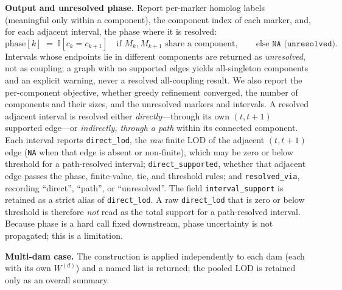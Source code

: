 \documentclass[11pt]{article}
\begin{document}
\medskip
\noindent\textbf{Output and unresolved phase.}
Report per-marker homolog labels (meaningful only within a component), the component index of each
marker, and, for each adjacent interval, the phase where it is resolved:
\[
  \text{phase}[k] \;=\; \mathbb{I}[c_k=c_{k+1}] \quad\text{if } M_k, M_{k+1} \text{ share a component},
  \qquad \text{else } \texttt{NA (unresolved)}.
\]
Intervals whose endpoints lie in different components are returned as \emph{unresolved}, not as
coupling; a graph with no supported edges yields all-singleton components and an explicit warning,
never a resolved all-coupling result. We also report the per-component objective, whether greedy
refinement converged, the number of components and their sizes, and the unresolved markers and
intervals. A resolved adjacent interval is resolved either \emph{directly}---through its own $(t,t{+}1)$
supported edge---or \emph{indirectly, through a path} within its connected component. Each interval
reports \texttt{direct\_lod}, the \emph{raw} finite LOD of the adjacent $(t,t{+}1)$ edge
(\texttt{NA} when that edge is absent or non-finite), which may be zero or below threshold for a
path-resolved interval; \texttt{direct\_supported}, whether that adjacent edge passes the phase,
finite-value, tie, and threshold rules; and \texttt{resolved\_via}, recording ``direct'', ``path'',
or ``unresolved''. The field \texttt{interval\_support} is retained as a strict alias of
\texttt{direct\_lod}. A raw \texttt{direct\_lod} that is zero or below threshold is therefore
\emph{not} read as the total support for a path-resolved interval. Because
phase is a hard call fixed downstream, phase uncertainty is not propagated; this is a limitation.

\medskip
\noindent\textbf{Multi-dam case.}
The construction is applied independently to each dam (each with its own \(W^{(d)}\)) and a named list
is returned; the pooled LOD is retained only as an overall summary.
\end{document}
